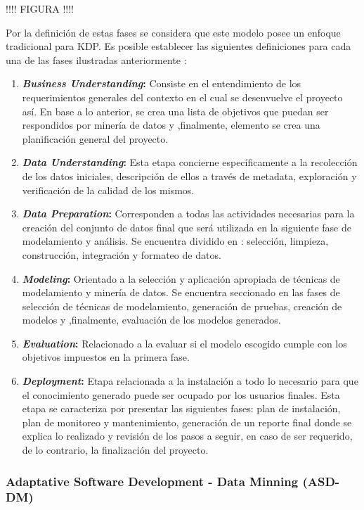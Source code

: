 !!!! FIGURA !!!!

Por la definición de estas fases se considera que este modelo posee un enfoque tradicional para KDP. Es posible establecer las siguientes definiciones para cada una de las fases ilustradas anteriormente \cite{knowledge_discovery}:

\begin{enumerate}
  \item \textbf{\textit{Business Understanding}:} Consiste en el entendimiento de los requerimientos generales del contexto en el cual se desenvuelve el proyecto así. En base a lo anterior, se crea una lista de objetivos que puedan ser respondidos por minería de datos y ,finalmente, elemento se crea una planificación general del proyecto.
  \item \textbf{\textit{Data Understanding}:} Esta etapa concierne específicamente a la recolección de los datos iniciales, descripción de ellos a través de metadata, exploración y verificación de la calidad de los mismos.
  \item \textbf{\textit{Data Preparation}:} Corresponden a todas las actividades necesarias para la creación del conjunto de datos final que será utilizada en la siguiente fase de modelamiento y análisis. Se encuentra dividido en : selección, limpieza, construcción, integración y formateo de datos.
  \item \textbf{\textit{Modeling}:} Orientado a la selección y aplicación apropiada de técnicas de modelamiento y minería de datos. Se encuentra seccionado en las fases de selección de técnicas de modelamiento, generación de pruebas, creación de modelos y ,finalmente, evaluación de los modelos generados.
  \item \textbf{\textit{Evaluation}:} Relacionado a la evaluar si el modelo escogido cumple con los objetivos impuestos en la primera fase.
  \item \textbf{\textit{Deployment}:} Etapa relacionada a la instalación a todo lo necesario para que el conocimiento generado puede ser ocupado por los usuarios finales. Esta etapa se caracteriza por presentar las siguientes fases: plan de instalación, plan de monitoreo y mantenimiento, generación de un reporte final donde se explica lo realizado y revisión de los pasos a seguir, en caso de ser requerido, de lo contrario, la finalización del proyecto.
\end{enumerate}

\subsubsection{Adaptative Software Development - Data Minning (ASD-DM) \label{asd_dm}}


